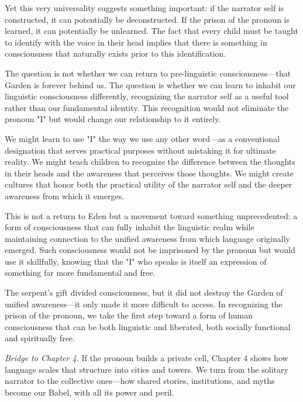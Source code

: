 Yet this very universality suggests something important: if the narrator self is constructed, it can potentially be deconstructed. If the prison of the pronoun is learned, it can potentially be unlearned. The fact that every child must be taught to identify with the voice in their head implies that there is something in consciousness that naturally exists prior to this identification.

The question is not whether we can return to pre-linguistic consciousness—that Garden is forever behind us. The question is whether we can learn to inhabit our linguistic consciousness differently, recognizing the narrator self as a useful tool rather than our fundamental identity. This recognition would not eliminate the pronoun "I" but would change our relationship to it entirely.

We might learn to use "I" the way we use any other word—as a conventional designation that serves practical purposes without mistaking it for ultimate reality. We might teach children to recognize the difference between the thoughts in their heads and the awareness that perceives those thoughts. We might create cultures that honor both the practical utility of the narrator self and the deeper awareness from which it emerges.

This is not a return to Eden but a movement toward something unprecedented: a form of consciousness that can fully inhabit the linguistic realm while maintaining connection to the unified awareness from which language originally emerged. Such consciousness would not be imprisoned by the pronoun but would use it skillfully, knowing that the "I" who speaks is itself an expression of something far more fundamental and free.

The serpent's gift divided consciousness, but it did not destroy the Garden of unified awareness—it only made it more difficult to access. In recognizing the prison of the pronoun, we take the first step toward a form of human consciousness that can be both linguistic and liberated, both socially functional and spiritually free.

\bigskip
\noindent\textit{Bridge to Chapter 4.} If the pronoun builds a private cell, Chapter 4 shows how language scales that structure into cities and towers. We turn from the solitary narrator to the collective ones—how shared stories, institutions, and myths become our Babel, with all its power and peril.

